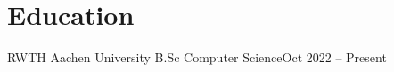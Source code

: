 \section{Education}
\resumeHeading
{RWTH Aachen University}
{B.Sc Computer Science}{Oct 2022 -- Present}

\resumeItemListStart
{}
\resumeItemListEnd



